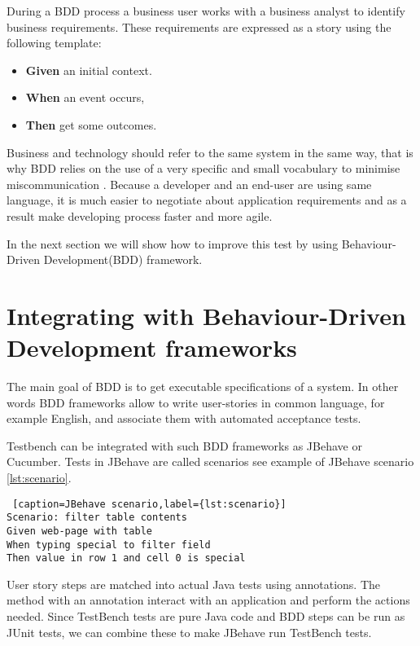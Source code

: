 During a BDD process a business user works with a business analyst
to identify business requirements. These requirements are expressed as a story
using the following template:

\begin{itemize}
  \item \textbf{Given} an initial context.
  \item \textbf{When} an event occurs,
   \item \textbf{Then} get some outcomes. 
\end{itemize}

Business and technology should refer to the same system in the same way, that is
why BDD relies on the use of a very specific and small vocabulary to minimise miscommunication \cite{bddSite}.
Because a developer and an end-user are using same language, it is much easier
to negotiate about application requirements and as a result make developing
process faster and more agile.

In the next section we will show how to improve this test by using
Behaviour-Driven Development(BDD) framework.

\section{Integrating with Behaviour-Driven Development frameworks}

The main goal of BDD is to get executable specifications of a system.
In other words BDD frameworks allow  to write user-stories in
common language, for example English, and associate them with automated
acceptance tests.

Testbench can be integrated with such BDD frameworks as JBehave
\cite{jBehaveSite} or Cucumber\cite{cucumberSite}.
Tests in JBehave are called scenarios see example of JBehave scenario
\ref{lst:scenario}.

 \lstset{style=console}
  \begin{lstlisting} [caption=JBehave scenario,label={lst:scenario}]
Scenario: filter table contents
Given web-page with table
When typing special to filter field
Then value in row 1 and cell 0 is special
  \end{lstlisting}
User story steps are matched into actual Java tests using annotations. 
The method with an annotation interact with an application and perform the actions needed.
Since TestBench tests are pure Java code and BDD steps can be run as JUnit tests, we can combine these to make
JBehave run TestBench tests.

